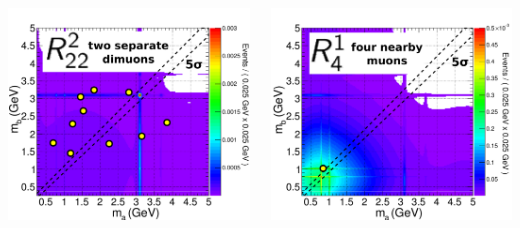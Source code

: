 \documentclass[compress]{beamer}
\begin{document}
\begin{frame}
\begin{columns}
\centering \includegraphics[width=0.9\linewidth]{b1_2dpdf.pdf}

\centering \includegraphics[width=0.9\linewidth]{a2_2dpdf.pdf}
\end{columns}
\end{frame}
\end{document}
